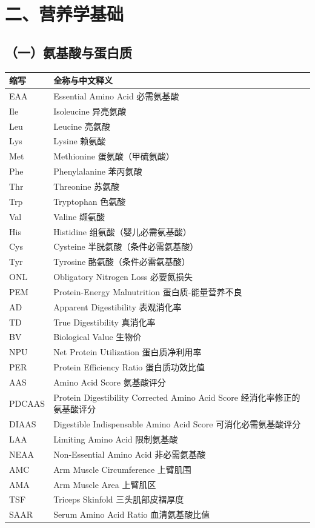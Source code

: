 \section{二、营养学基础}

\subsection*{（一）氨基酸与蛋白质}

\begin{table}[H]
\centering
\begin{tabularx}{\textwidth}{lX}
\toprule
\textbf{缩写} & \textbf{全称与中文释义} \\
\midrule
EAA & Essential Amino Acid \hfill 必需氨基酸 \\
Ile & Isoleucine \hfill 异亮氨酸 \\
Leu & Leucine \hfill 亮氨酸 \\
Lys & Lysine \hfill 赖氨酸 \\
Met & Methionine \hfill 蛋氨酸（甲硫氨酸） \\
Phe & Phenylalanine \hfill 苯丙氨酸 \\
Thr & Threonine \hfill 苏氨酸 \\
Trp & Tryptophan \hfill 色氨酸 \\
Val & Valine \hfill 缬氨酸 \\
His & Histidine \hfill 组氨酸（婴儿必需氨基酸） \\
Cys & Cysteine \hfill 半胱氨酸（条件必需氨基酸） \\
Tyr & Tyrosine \hfill 酪氨酸（条件必需氨基酸） \\
ONL & Obligatory Nitrogen Loss \hfill 必要氮损失 \\
PEM & Protein-Energy Malnutrition \hfill 蛋白质-能量营养不良 \\
AD & Apparent Digestibility \hfill 表观消化率 \\
TD & True Digestibility \hfill 真消化率 \\
BV & Biological Value \hfill 生物价 \\
NPU & Net Protein Utilization \hfill 蛋白质净利用率 \\
PER & Protein Efficiency Ratio \hfill 蛋白质功效比值 \\
AAS & Amino Acid Score \hfill 氨基酸评分 \\
PDCAAS & Protein Digestibility Corrected Amino Acid Score \hfill 经消化率修正的氨基酸评分 \\
DIAAS & Digestible Indispensable Amino Acid Score \hfill 可消化必需氨基酸评分 \\
LAA & Limiting Amino Acid \hfill 限制氨基酸 \\
NEAA & Non-Essential Amino Acid \hfill 非必需氨基酸 \\
AMC & Arm Muscle Circumference \hfill 上臂肌围 \\
AMA & Arm Muscle Area \hfill 上臂肌区 \\
TSF & Triceps Skinfold \hfill 三头肌部皮褶厚度 \\
SAAR & Serum Amino Acid Ratio \hfill 血清氨基酸比值 \\
\bottomrule
\end{tabularx}
\end{table}

